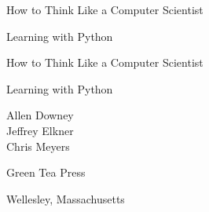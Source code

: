 \documentclass[b5paper,10pt]{book}
\newcommand{\clearemptydoublepage}{\newpage{\pagestyle{empty}\cleardoublepage}}
\renewcommand{\clearemptydoublepage}{\cleardoublepage}
\begin{document}
\frontmatter

\thispagestyle{empty}

\begin{flushright}
\vspace*{2.5in}

{\huge How to Think Like a Computer Scientist}

\vspace{1in}

{\LARGE Learning with Python}

\vfill

\end{flushright}


\clearemptydoublepage

\pagebreak
\thispagestyle{empty}

\begin{flushright}
\vspace*{2.5in}

{\huge How to Think Like a Computer Scientist}

\vspace{0.25in}

{\LARGE Learning with Python}

\vspace{1in}

{\Large
Allen Downey\\
Jeffrey Elkner\\
Chris Meyers\\
}


\vspace{1in}

{\Large Green Tea Press}

{\small Wellesley, Massachusetts}

\vfill

\end{flushright}


\pagebreak
\thispagestyle{empty}
\end{document}

